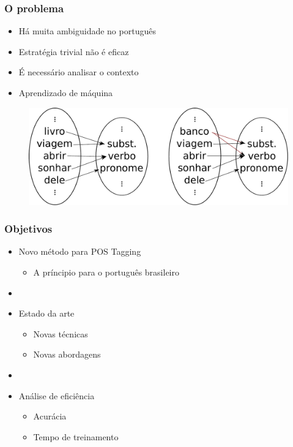 \documentclass[10pt]{beamer}
\begin{document}
\begin{frame}[fragile]
  \frametitle{O problema}

  

 \begin{itemize}
      \item[-] Há muita ambiguidade no português 
      \item[-] Estratégia trivial não é eficaz
      \item[-] É necessário analisar o contexto
      \item[-] Aprendizado de máquina
    \end{itemize}

  
    \begin{figure}[htb]
    \begin{center}
        \includegraphics[scale=0.35]{img/funcoes.pdf}
    \end{center}
  \end{figure}

\end{frame}



\begin{frame}[fragile]
  \frametitle{Objetivos}


 \begin{itemize}
    \item[-] Novo método para POS Tagging
    \begin{itemize}
      \item[-] A príncipio para o português brasileiro
    \end{itemize}
    \item[\ ] \ 
    \item[-] Estado da arte
    \begin{itemize}
      \item[-] Novas técnicas
      \item[-] Novas abordagens
    \end{itemize}
     \item[\ ] \ 
    \item[-] Análise de eficiência
    \begin{itemize}
      \item[-] Acurácia
      \item[-] Tempo de treinamento
    \end{itemize}
  \end{itemize}

\end{frame}
\end{document}
